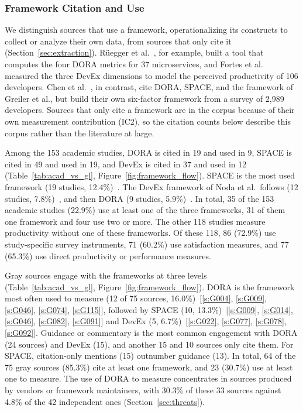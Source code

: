\documentclass[preprint,number]{elsarticle}
\newcounter{study}
\newcommand{\refG}[1]{\ref{s:#1}}
\begin{document}
\subsubsection{Framework Citation and Use}

We distinguish sources that use a framework, operationalizing its constructs to collect or analyze their own data, from sources that only cite it (Section~\ref{sec:extraction}). R\"uegger et al.~\cite{P0470}, for example, built a tool that computes the four DORA metrics for 37 microservices, and Fortes et al.~\cite{P0244} measured the three DevEx dimensions to model the perceived productivity of 106 developers. Chen et al.~\cite{P2100}, in contrast, cite DORA, SPACE, and the framework of Greiler et al., but build their own six-factor framework from a survey of 2,989 developers. Sources that only cite a framework are in the corpus because of their own measurement contribution (IC2), so the citation counts below describe this corpus rather than the literature at large.

Among the 153 academic studies, DORA is cited in 19 and used in 9, SPACE is cited in 49 and used in 19, and DevEx is cited in 37 and used in 12 (Table~\ref{tab:acad_vs_gl}, Figure~\ref{fig:framework_flow}). SPACE is the most used framework (19 studies, 12.4\%)~\cite{P1259, P0001, P1816, P0112, P0061, P0549, P1261, P1476, P1303, P0181, P2019, P2020, P2038, P2041, P2059, P2073, P2131, P2133, P2134}. The DevEx framework of Noda et al.\ follows (12 studies, 7.8\%)~\cite{P1280, P1356, P0021, P0593, P0001, P0244, P1261, P2015, P2019, P2073, P2079, P2080}, and then DORA (9 studies, 5.9\%)~\cite{P0470, P0003, P1261, P2008, P2013, P2014, P2017, P2026, P2043}. In total, 35 of the 153 academic studies (22.9\%) use at least one of the three frameworks, 31 of them one framework and four use two or more. The other 118 studies measure productivity without one of these frameworks. Of these 118, 86 (72.9\%) use study-specific survey instruments, 71 (60.2\%) use satisfaction measures, and 77 (65.3\%) use direct productivity or performance measures.

Gray sources engage with the frameworks at three levels (Table~\ref{tab:acad_vs_gl}, Figure~\ref{fig:framework_flow}). DORA is the framework most often used to measure (12 of 75 sources, 16.0\%)~[\refG{G004}, \refG{G009}, \refG{G046}, \refG{G074}, \refG{G115}], followed by SPACE (10, 13.3\%)~[\refG{G009}, \refG{G014}, \refG{G046}, \refG{G082}, \refG{G091}] and DevEx (5, 6.7\%)~[\refG{G022}, \refG{G077}, \refG{G078}, \refG{G092}]. Guidance or commentary is the most common engagement with DORA (24 sources) and DevEx (15), and another 15 and 10 sources only cite them. For SPACE, citation-only mentions (15) outnumber guidance (13). In total, 64 of the 75 gray sources (85.3\%) cite at least one framework, and 23 (30.7\%) use at least one to measure. The use of DORA to measure concentrates in sources produced by vendors or framework maintainers, with 30.3\% of these 33 sources against 4.8\% of the 42 independent ones (Section~\ref{sec:threats}).
\end{document}
